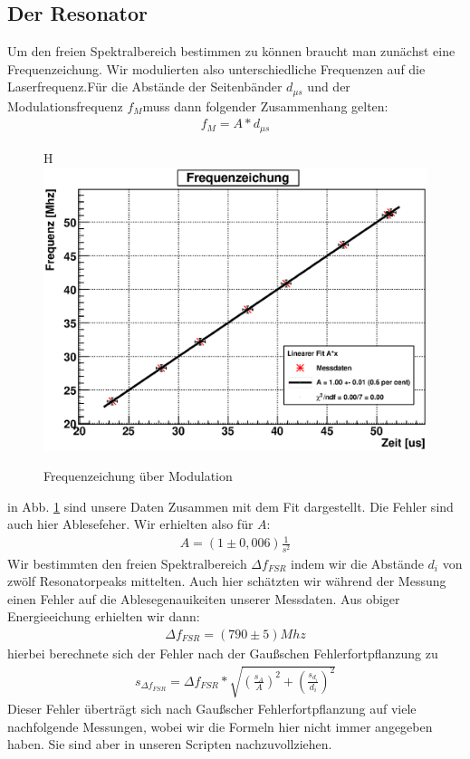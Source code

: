 \documentclass[12pt]{article}
\begin{document}
\subsection{Der Resonator}
Um den freien Spektralbereich bestimmen zu können braucht man zunächst eine Frequenzeichung. Wir modulierten also unterschiedliche Frequenzen auf die Laserfrequenz.Für die Abstände der Seitenbänder $d_{\mu s}$ und der Modulationsfrequenz $f_M$muss dann folgender Zusammenhang gelten:
\begin{align*}
 f_M = A * d_{\mu s}
\end{align*} 
\begin{figure}H
 \includegraphics[width=0.9\linewidth]{pictures/eichung.eps}
 \caption{Frequenzeichung über Modulation}
 \label{eichung}
\end{figure}
in Abb. \ref{eichung} sind unsere Daten Zusammen mit dem Fit dargestellt. Die Fehler sind auch hier Ablesefeher. Wir erhielten also für $A$:
\begin{align*}
 A = (1 \pm 0,006) \frac{1}{s^2}
\end{align*} 
Wir bestimmten den freien Spektralbereich $\Delta f_{FSR}$ indem wir die Abstände $d_i$ von zwölf Resonatorpeaks mittelten. Auch hier schätzten wir während der Messung einen Fehler auf die Ablesegenauikeiten unserer Messdaten. Aus obiger Energieeichung erhielten wir dann:
\begin{align*}
 \Delta f_{FSR} = (790\pm5) Mhz
\end{align*}
hierbei berechnete sich der Fehler nach der Gaußschen Fehlerfortpflanzung zu
\begin{align*}
 s_{\Delta f_{FSR}} = \Delta f_{FSR} * \sqrt{ \left( \frac{s_A}{A} \right)^2 + \left( \frac{s_{d_i}}{d_i} \right)^2}
\end{align*}
Dieser Fehler überträgt sich nach Gaußscher Fehlerfortpflanzung auf viele nachfolgende Messungen, wobei wir die Formeln hier nicht immer angegeben haben. Sie sind aber in unseren Scripten nachzuvollziehen.
\end{document}
